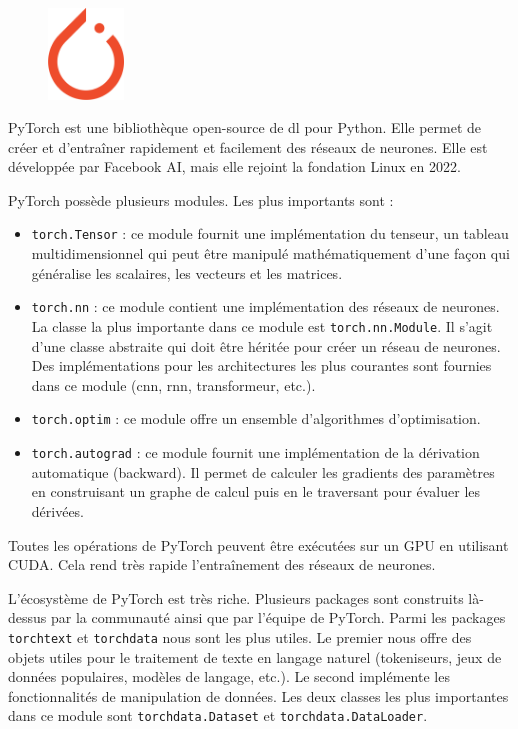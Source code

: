 \begin{figure}
    \vspace*{-\topsep}
    \begin{flushright}
        \includegraphics[width=2cm]{assets/images/torch.png}
    \end{flushright}
\end{figure}
PyTorch est une bibliothèque open-source de \gls{dl} pour Python.
Elle permet de créer et d'entraîner rapidement et facilement des réseaux de neurones.
Elle est développée par Facebook AI, mais elle rejoint la fondation Linux en 2022.

PyTorch possède plusieurs modules.
Les plus importants sont :
\begin{itemize}
    \item \verb|torch.Tensor| : 
    ce module fournit une implémentation du tenseur,
    un tableau multidimensionnel qui peut être manipulé mathématiquement 
    d'une façon qui généralise les scalaires, les vecteurs et les matrices.
    \item \verb|torch.nn| : 
    ce module contient une implémentation des réseaux de neurones.
    La classe la plus importante dans ce module est \verb|torch.nn.Module|.
    Il s'agit d'une classe abstraite qui doit être héritée pour créer un réseau de neurones.
    Des implémentations pour les architectures les plus courantes sont fournies dans ce module
    (\gls{cnn}, \gls{rnn}, transformeur, etc.).
    \item \verb|torch.optim| : 
    ce module offre un ensemble d'algorithmes d'optimisation.
    \item \verb|torch.autograd| : 
    ce module fournit une implémentation de la dérivation automatique (\foreignlanguage{english}{backward}).
    Il permet de calculer les gradients des paramètres en construisant un graphe de calcul 
    puis en le traversant pour évaluer les dérivées.
\end{itemize}
Toutes les opérations de PyTorch peuvent être exécutées sur un GPU en utilisant CUDA.
Cela rend très rapide l'entraînement des réseaux de neurones.

L'écosystème de PyTorch est très riche.
Plusieurs packages sont construits là-dessus par la communauté ainsi que par l'équipe de PyTorch.
Parmi les packages \verb|torchtext| et \verb|torchdata| nous sont les plus utiles.
Le premier nous offre des objets utiles pour le traitement de texte en langage naturel
(tokeniseurs, jeux de données populaires, modèles de langage, etc.).
Le second implémente les fonctionnalités de manipulation de données.
Les deux classes les plus importantes dans ce module sont \verb|torchdata.Dataset| et \verb|torchdata.DataLoader|.


